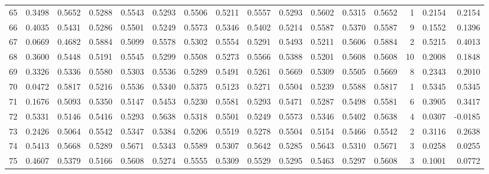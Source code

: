 \begin{tabular}{lrrrrrrrrrrrrrrr}
65  &      0.3498 &  0.5652 &  0.5288 &  0.5543 &  0.5293 &  0.5506 &  0.5211 &  0.5557 &  0.5293 &  0.5602 &   0.5315 &     0.5652 &      1 &                    0.2154 &                     0.2154 \\
66  &      0.4035 &  0.5431 &  0.5286 &  0.5501 &  0.5249 &  0.5573 &  0.5346 &  0.5402 &  0.5214 &  0.5587 &   0.5370 &     0.5587 &      9 &                    0.1552 &                     0.1396 \\
67  &      0.0669 &  0.4682 &  0.5884 &  0.5099 &  0.5578 &  0.5302 &  0.5554 &  0.5291 &  0.5493 &  0.5211 &   0.5606 &     0.5884 &      2 &                    0.5215 &                     0.4013 \\
68  &      0.3600 &  0.5448 &  0.5191 &  0.5545 &  0.5299 &  0.5508 &  0.5273 &  0.5566 &  0.5388 &  0.5201 &   0.5608 &     0.5608 &     10 &                    0.2008 &                     0.1848 \\
69  &      0.3326 &  0.5336 &  0.5580 &  0.5303 &  0.5536 &  0.5289 &  0.5491 &  0.5261 &  0.5669 &  0.5309 &   0.5505 &     0.5669 &      8 &                    0.2343 &                     0.2010 \\
70  &      0.0472 &  0.5817 &  0.5216 &  0.5536 &  0.5340 &  0.5375 &  0.5123 &  0.5271 &  0.5504 &  0.5239 &   0.5588 &     0.5817 &      1 &                    0.5345 &                     0.5345 \\
71  &      0.1676 &  0.5093 &  0.5350 &  0.5147 &  0.5453 &  0.5230 &  0.5581 &  0.5293 &  0.5471 &  0.5287 &   0.5498 &     0.5581 &      6 &                    0.3905 &                     0.3417 \\
72  &      0.5331 &  0.5146 &  0.5416 &  0.5293 &  0.5638 &  0.5318 &  0.5501 &  0.5249 &  0.5573 &  0.5346 &   0.5402 &     0.5638 &      4 &                    0.0307 &                    -0.0185 \\
73  &      0.2426 &  0.5064 &  0.5542 &  0.5347 &  0.5384 &  0.5206 &  0.5519 &  0.5278 &  0.5504 &  0.5154 &   0.5466 &     0.5542 &      2 &                    0.3116 &                     0.2638 \\
74  &      0.5413 &  0.5668 &  0.5289 &  0.5671 &  0.5343 &  0.5589 &  0.5307 &  0.5642 &  0.5285 &  0.5643 &   0.5310 &     0.5671 &      3 &                    0.0258 &                     0.0255 \\
75  &      0.4607 &  0.5379 &  0.5166 &  0.5608 &  0.5274 &  0.5555 &  0.5309 &  0.5529 &  0.5295 &  0.5463 &   0.5297 &     0.5608 &      3 &                    0.1001 &                     0.0772 \\

\end{tabular}
